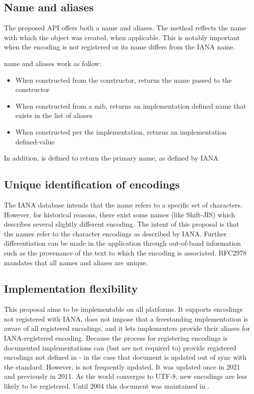 \documentclass{wg21}
\begin{document}
\subsection{Name and aliases}

The proposed API offers both a name and aliases.
The  method reflects the name with which the  object was created, when applicable.
This is notably important when the encoding is not registered or its name differs from the IANA name.

name and aliases work as follow:

\begin{itemize}
\item When constructed from the  constructor,  returns the name passed to the constructor
\item When constructed from a mib,  returns an implementation defined name that exists in the list of aliases
\item When constructed per the implementation,  returns an implementation defined-value
\end{itemize}

In addition,  is defined to return the primary name, as defined by IANA

\subsection{Unique identification of encodings}

The IANA database intends that the name refers to a specific set of characters.
However, for historical reasons, there exist some names (like Shift-JIS) which describes several slightly different encoding.
The intent of this proposal is that the names refer to the character encodings as described by IANA.
Further differentiation can be made in the application through out-of-band information such as the provenance of the text to which the encoding is associated. RFC2978 mandates that all names and aliases are unique.

\subsection{Implementation flexibility}

This proposal aims to be implementable on all platforms. It supports encodings not registered with IANA, does not impose that
a freestanding implementation is aware of all registered encodings, and it lets implementers provide their aliases for IANA-registered encoding.
Because the process for registering encodings is documented \cite{rfc2978} implementations can (but are not required to) provide
registered encodings not defined in \cite{ianacharset-mib} - in the case that document is updated out of sync with the standard.
However, \cite{ianacharset-mib} is not frequently updated. It was updated once in 2021 and previously in 2011.
As the world converges to UTF-8, new encodings are less likely to be registered.
Until 2004 this document was maintained in \cite{rfc3808}.
\end{document}
